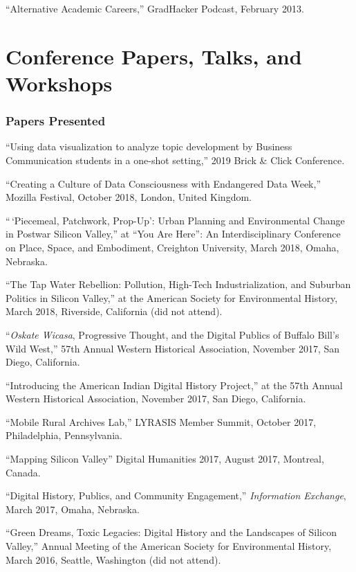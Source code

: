 ``Alternative Academic Careers,'' GradHacker Podcast, February 2013.

\section{Conference Papers, Talks, and
Workshops}\label{conference-papers-talks-and-workshops}

\subsubsection{Papers Presented}\label{papers-presented}

``Using data visualization to analyze topic development by Business
Communication students in a one-shot setting,'' 2019 Brick \& Click
Conference.

``Creating a Culture of Data Consciousness with Endangered Data Week,''
Mozilla Festival, October 2018, London, United Kingdom.

``\,`Piecemeal, Patchwork, Prop-Up': Urban Planning and Environmental
Change in Postwar Silicon Valley,'' at ``You Are Here'': An
Interdisciplinary Conference on Place, Space, and Embodiment, Creighton
University, March 2018, Omaha, Nebraska.

``The Tap Water Rebellion: Pollution, High-Tech Industrialization, and
Suburban Politics in Silicon Valley,'' at the American Society for
Environmental History, March 2018, Riverside, California (did not
attend).

``\emph{Oskate Wicasa}, Progressive Thought, and the Digital Publics of
Buffalo Bill's Wild West,'' 57th Annual Western Historical Association,
November 2017, San Diego, California.

``Introducing the American Indian Digital History Project,'' at the 57th
Annual Western Historical Association, November 2017, San Diego,
California.

``Mobile Rural Archives Lab,'' LYRASIS Member Summit, October 2017,
Philadelphia, Pennsylvania.

``Mapping Silicon Valley'' Digital Humanities 2017, August 2017,
Montreal, Canada.

``Digital History, Publics, and Community Engagement,''
\emph{Information Exchange}, March 2017, Omaha, Nebraska.

``Green Dreams, Toxic Legacies: Digital History and the Landscapes of
Silicon Valley,'' Annual Meeting of the American Society for
Environmental History, March 2016, Seattle, Washington (did not attend).

